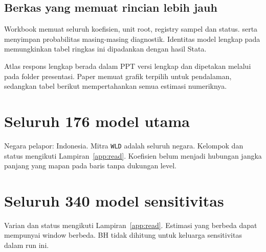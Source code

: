 \subsection{Berkas yang memuat rincian lebih jauh}
Workbook  memuat seluruh koefisien, unit root, registry sampel dan status.  serta  menyimpan probabilitas masing-masing diagnostik. Identitas model lengkap pada  memungkinkan tabel ringkas ini dipadankan dengan hasil Stata.

Atlas respons lengkap berada dalam PPT versi lengkap dan dipetakan melalui  pada folder presentasi. Paper memuat grafik terpilih untuk pendalaman, sedangkan tabel berikut mempertahankan semua estimasi numeriknya.

\clearpage\section{Seluruh 176 model utama}
\noindent Negara pelapor: Indonesia. Mitra \texttt{WLD} adalah seluruh negara. Kelompok dan status mengikuti Lampiran~\ref{app:read}. Koefisien belum menjadi hubungan jangka panjang yang mapan pada baris tanpa dukungan level.


\clearpage\section{Seluruh 340 model sensitivitas}
\noindent Varian dan status mengikuti Lampiran~\ref{app:read}. Estimasi yang berbeda dapat mempunyai window berbeda. BH tidak dihitung untuk keluarga sensitivitas dalam run ini.


